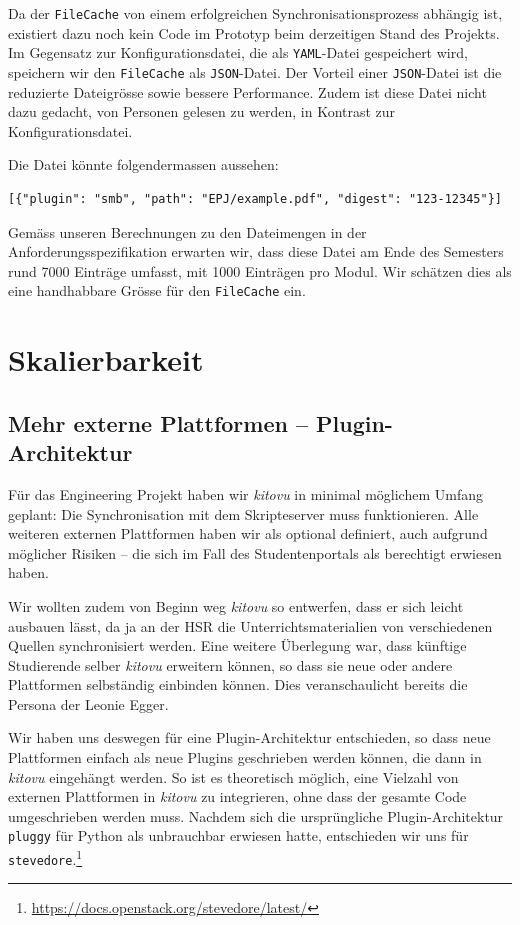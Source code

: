 \documentclass[a4paper]{article}
\let\oldsection\section
\renewcommand\section{\clearpage\oldsection}
\begin{document}
Da der \verb|FileCache| von einem erfolgreichen Synchronisationsprozess abhängig ist, existiert dazu noch kein Code im Prototyp beim derzeitigen Stand des Projekts. Im Gegensatz zur Konfigurationsdatei, die als \verb|YAML|-Datei gespeichert wird, speichern wir den \verb|FileCache| als \verb|JSON|-Datei. Der Vorteil einer \verb|JSON|-Datei ist die reduzierte Dateigrösse sowie bessere Performance. Zudem ist diese Datei nicht dazu gedacht, von Personen gelesen zu werden, in Kontrast zur Konfigurationsdatei.

Die Datei könnte folgendermassen aussehen:

\begin{verbatim}
[{"plugin": "smb", "path": "EPJ/example.pdf", "digest": "123-12345"}]
\end{verbatim}

Gemäss unseren Berechnungen zu den Dateimengen in der Anforderungsspezifikation erwarten wir, dass diese Datei am Ende des Semesters rund 7000 Einträge umfasst, mit 1000 Einträgen pro Modul. Wir schätzen dies als eine handhabbare Grösse für den \verb|FileCache| ein.

\section{Skalierbarkeit}

\subsection{Mehr externe Plattformen -- Plugin-Architektur}

Für das Engineering Projekt haben wir \emph{kitovu} in minimal möglichem Umfang geplant: Die Synchronisation mit dem Skripteserver muss funktionieren. Alle weiteren externen Plattformen haben wir als optional definiert, auch aufgrund möglicher Risiken -- die sich im Fall des Studentenportals als berechtigt erwiesen haben.

Wir wollten zudem von Beginn weg \emph{kitovu} so entwerfen, dass er sich leicht ausbauen lässt, da ja an der HSR die Unterrichtsmaterialien von verschiedenen Quellen synchronisiert werden. Eine weitere Überlegung war, dass künftige Studierende selber \emph{kitovu} erweitern können, so dass sie neue oder andere Plattformen selbständig einbinden können. Dies veranschaulicht bereits die Persona der Leonie Egger. 

Wir haben uns deswegen für eine Plugin-Architektur entschieden, so dass neue Plattformen einfach als neue Plugins geschrieben werden können, die dann in \emph{kitovu} eingehängt werden. So ist es theoretisch möglich, eine Vielzahl von externen Plattformen in \emph{kitovu} zu integrieren, ohne dass der gesamte Code umgeschrieben werden muss. Nachdem sich die ursprüngliche Plugin-Architektur \verb|pluggy| für Python als unbrauchbar erwiesen hatte, entschieden wir uns für \verb|stevedore|.\footnote{\url{https://docs.openstack.org/stevedore/latest/}}
\end{document}
